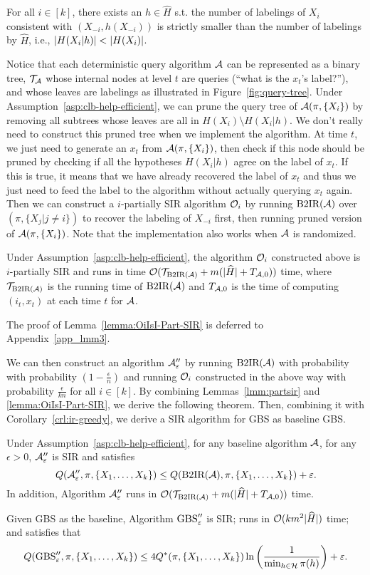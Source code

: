 \begin{assumption}\label{asp:clb-help-efficient}
    For all $i\in [k]$, there exists an $h\in \hat H$ s.t.  
    the number of labelings of $X_i$ consistent with $(X_{-i}, h(X_{-i}))$ is strictly smaller than the number of labelings by $\hat H$, i.e., $\left|H(X_i|h)\right| < \left|H(X_i)\right|$.
\end{assumption}
Notice that each deterministic query algorithm $\mathcal{A}$ can be represented as a binary tree, $\mathcal{T}_{\mathcal{A}}$ whose internal nodes at level $t$ are queries (``what is the $x_t$'s label?''), and whose leaves are labelings as illustrated in Figure~\ref{fig:query-tree}.
Under Assumption~\ref{asp:clb-help-efficient}, we can prune the query tree of $\mathcal{A}(\pi, \{X_i\})$ by removing
all subtrees whose leaves are all in $H(X_i)\setminus H(X_i|h)$.
We don't really need to construct this pruned tree when we implement the algorithm. At time $t$, we just need to generate an $x_t$ from $\mathcal{A}(\pi, \{X_i\})$, then check if this node should be pruned by checking if all the hypotheses $H(X_i|h)$ agree on the label of $x_t$. If this is true, it means that we have already recovered the label of $x_t$ and thus we just need to feed the label to the algorithm without actually querying $x_t$ again.
Then we can construct a $i$-partially SIR algorithm $\mathcal{O}_i$ by running $\textrm{B2IR}(\mathcal{A})$ over $(\pi, \{X_j|j\neq i\})$ to recover the labeling of $X_{-i}$ first, then running pruned version of $\mathcal{A}(\pi, \{X_i\})$. Note that the implementation also works when $\mathcal{A}$ is randomized.

\begin{lemma}\label{lemma:OiIsI-Part-SIR}
Under Assumption~\ref{asp:clb-help-efficient}, the algorithm $\mathcal{O}_i$ constructed above is $i$-partially SIR and runs in time $\mathcal{O}(\mathcal{T}_{\textrm{B2IR}(\mathcal{A})} + m (|\widehat H| + T_{\mathcal{A},0}))$ time, where $\mathcal{T}_{\textrm{B2IR}(\mathcal{A})}$ is the running time of $\textrm{B2IR}(\mathcal{A})$ and $T_{\mathcal{A},0}$ is the time of computing $(i_t,x_t)$ at each time $t$ for $\mathcal{A}$.

\end{lemma}
The proof of Lemma~\ref{lemma:OiIsI-Part-SIR} is deferred to Appendix~\ref{app_lmm3}.

We can then construct an algorithm $\mathcal{A}_\varepsilon''$ by running $\textrm{B2IR}(\mathcal{A})$ with probability with probability $(1-\frac{\epsilon}{n})$ and running $\mathcal{O}_i$ constructed in the above way with probability $\frac{\epsilon}{kn}$ for all $i\in [k]$. By combining Lemmas~\ref{lmm:partsir} and \ref{lemma:OiIsI-Part-SIR}, we derive the following theorem. Then, combining it with Corollary~\ref{crl:ir-greedy}, we derive a SIR algorithm for GBS as baseline GBS.
\begin{theorem}
Under Assumption~\ref{asp:clb-help-efficient}, for any baseline algorithm $\mathcal{A}$, for any $\epsilon>0$, $\mathcal{A}_\varepsilon''$ is SIR and satisfies $$Q(\mathcal{A}''_\varepsilon, \pi, \{X_1,\ldots,X_k\})\leq Q(\textrm{B2IR}(\mathcal{A}),\pi, \{X_1,\ldots,X_k\}) +\varepsilon.$$
In addition, Algorithm $\mathcal{A}_\varepsilon''$ runs in $\mathcal{O}(\mathcal{T}_{\textrm{B2IR}(\mathcal{A})} + m (|\widehat H| + T_{\mathcal{A},0}))$ time.
\end{theorem}

\begin{corollary}
Given GBS as the baseline, Algorithm $\textrm{GBS}_\varepsilon''$ is SIR; runs in $\mathcal{O}(k m^2 |\widehat H|)$ time; and satisfies that $$Q(\textrm{GBS}_\varepsilon'', \pi, \{X_1,\ldots,X_k\})\leq 4Q^*(\pi, \{X_1,\ldots,X_k\}) \ln\left(\frac{1}{\min_{h\in \mathcal{H}}\pi(h)}\right) +\varepsilon.$$
\end{corollary}

